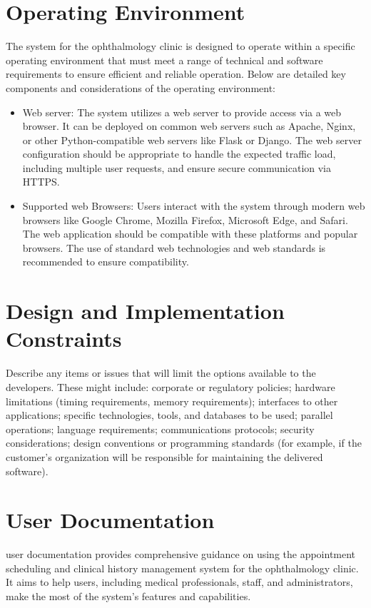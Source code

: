 \documentclass{scrreprt}
\begin{document}
	
	\section{Operating Environment}
	The system for the ophthalmology clinic is designed to operate within a specific operating environment that must meet a range of technical and software requirements to ensure efficient and reliable operation. Below are detailed key components and considerations of the operating environment:
	\begin{itemize}
		\item Web server: The system utilizes a web server to provide access via a web browser. It can be deployed on common web servers such as Apache, Nginx, or other Python-compatible web servers like Flask or Django. The web server configuration should be appropriate to handle the expected traffic load, including multiple user requests, and ensure secure communication via HTTPS.
		
		\item Supported web Browsers: Users interact with the system through modern web browsers like Google Chrome, Mozilla Firefox, Microsoft Edge, and Safari. The web application should be compatible with these platforms and popular browsers. The use of standard web technologies and web standards is recommended to ensure compatibility.
		
	\end{itemize}
	
	
	\section{Design and Implementation Constraints}
	 Describe any items or issues that will limit the options available to the 
	developers. These might include: corporate or regulatory policies; hardware 
	limitations (timing requirements, memory requirements); interfaces to other 
	applications; specific technologies, tools, and databases to be used; parallel 
	operations; language requirements; communications protocols; security 
	considerations; design conventions or programming standards (for example, if the 
	customer’s organization will be responsible for maintaining the delivered 
	software).
	
	\section{User Documentation}
	 user documentation provides comprehensive guidance on using the appointment scheduling and clinical history management system for the ophthalmology clinic. It aims to help users, including medical professionals, staff, and administrators, make the most of the system's features and capabilities.
	 
\end{document}
